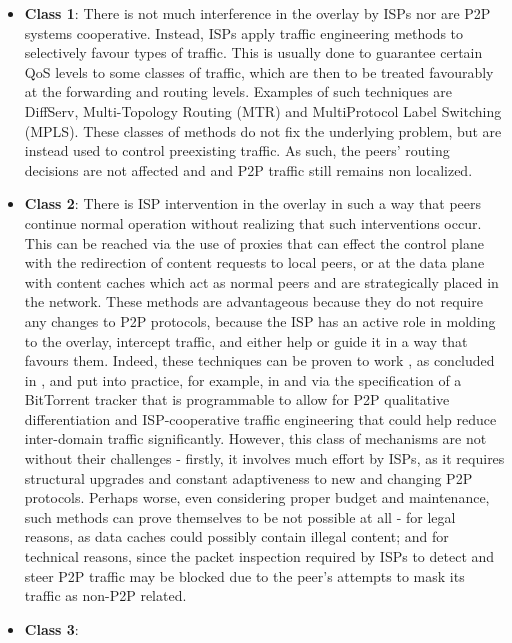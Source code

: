 \begin{itemize}
    \item \textbf{Class 1}:
        There is not much interference in the overlay by ISPs nor are P2P systems cooperative.
        Instead, ISPs apply traffic engineering methods to selectively favour types of traffic.
        This is usually done to guarantee certain QoS levels to some classes of traffic, which are then to be treated favourably at the forwarding and routing levels.
        Examples of such techniques are DiffServ, Multi-Topology Routing (MTR) and MultiProtocol Label Switching (MPLS).
        These classes of methods do not fix the underlying problem, but are instead used to control preexisting traffic.
        As such, the peers' routing decisions are not affected and and P2P traffic still remains non localized.
    \item \textbf{Class 2}:
        There is ISP intervention in the overlay in such a way that peers continue normal operation without realizing that such interventions occur.
        This can be reached via the use of proxies that can effect the control plane with the redirection of content requests to local peers, or at the data plane with content caches which act as normal peers and are strategically placed in the network.
        These methods are advantageous because they do not require any changes to P2P protocols, because the ISP has an active role in molding to the overlay, intercept traffic, and either help or guide it in a way that favours them.
        Indeed, these techniques can be proven to work , as concluded in \cite{dan-Commag10}, and put into practice, for example, in \cite{programmable-trackers} and \cite{configurable-trackers} via the specification of a BitTorrent tracker that is programmable to allow for P2P qualitative differentiation and ISP-cooperative traffic engineering that could help reduce inter-domain traffic significantly.
        However, this class of mechanisms are not without their challenges - firstly, it involves much effort by ISPs, as it requires structural upgrades and constant adaptiveness to new and changing P2P protocols.
        Perhaps worse, even considering proper budget and maintenance, such methods can prove themselves to be not possible at all - for legal reasons, as data caches could possibly contain illegal content; and for technical reasons, since the packet inspection required by ISPs to detect and steer P2P traffic may be blocked due to the peer's attempts to mask its traffic as non-P2P related.
    \item \textbf{Class 3}:

\end{itemize}
